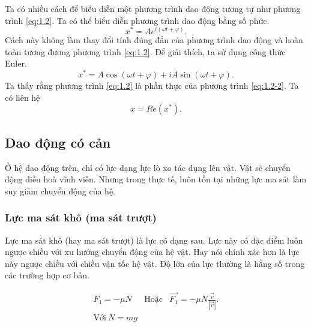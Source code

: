 Ta có nhiều cách để biểu diễn một phương trình dao động tương tự như phương trình \ref{eq:1.2}. Ta có thể biểu diễn phương trình dao động bằng số phức.
\begin{equation}
    x^* = A e^{i \left( \omega t + \varphi \right)}.
    \label{eq:1.2-2}
\end{equation}
Cách này không làm thay đổi tính đúng đắn của phương trình dao động và hoàn toàn tương đương phương trình \ref{eq:1.2}. Để giải thích, ta sử dụng công thức Euler.
\begin{equation*}
    x^* = A \cos{\left( \omega t + \varphi \right)} + i A \sin{\left( \omega t + \varphi \right)}.
\end{equation*}
Ta thấy rằng phương trình \ref{eq:1.2} là phần thực của phương trình \ref{eq:1.2-2}. Ta có liên hệ
\begin{equation}
    x = Re (x^*).
\end{equation}
\subsection{Dao động có cản}
Ở hệ dao động trên, chỉ có lực dạng lực lò xo tác dụng lên vật. Vật sẽ chuyển động điều hoà vĩnh viễn. Nhưng trong thực tế, luôn tồn tại những lực ma sát làm suy giảm chuyển động của hệ. 


\subsubsection{Lực ma sát khô (ma sát trượt)}

Lực ma sát khô (hay ma sát trượt) là lực có dạng sau. Lực này có đặc điểm luôn ngược chiều với xu hướng chuyển động của hệ vật. Hay nói chính xác hơn là lực này ngược chiều với chiều vận tốc hệ vật. Độ lớn của lực thường là hằng số trong các trường hợp cơ bản.

\begin{equation}
\begin{array}{ccc}
    F_1 = - \mu N &\text{Hoặc} & \Vec{F_1} = - \mu N {\displaystyle  \frac{\Vec{v}}{|\Vec{v}|}}. \\
    \text{Với} \ N = mg & &
\end{array}
\label{eq:1.3}
\end{equation}

\begin{figure}[!htb]
    \centering
    \scalebox{0.8}{}
    \caption{}
    \label{fig:1.2}
\end{figure}


